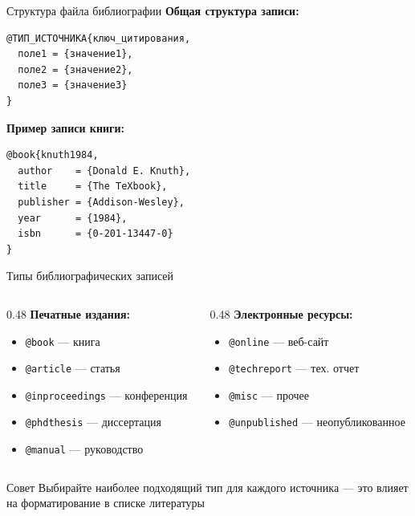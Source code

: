 \documentclass[aspectratio=169, 12pt]{beamer}
\begin{document}
\begin{frame}[fragile]{Структура файла библиографии}
  \textbf{Общая структура записи:}
  
  \begin{lstlisting}
@ТИП_ИСТОЧНИКА{ключ_цитирования,
  поле1 = {значение1},
  поле2 = {значение2},
  поле3 = {значение3}
}
  \end{lstlisting}
  
  \vspace{0.5cm}
  
  \textbf{Пример записи книги:}
  
  \begin{lstlisting}
@book{knuth1984,
  author    = {Donald E. Knuth},
  title     = {The TeXbook},
  publisher = {Addison-Wesley},
  year      = {1984},
  isbn      = {0-201-13447-0}
}
  \end{lstlisting}
\end{frame}

\begin{frame}{Типы библиографических записей}
  \begin{columns}[T]
    \begin{column}{0.48\textwidth}
      \textbf{Печатные издания:}
      \begin{itemize}
        \item \texttt{@book} — книга
        \item \texttt{@article} — статья
        \item \texttt{@inproceedings} — конференция
        \item \texttt{@phdthesis} — диссертация
        \item \texttt{@manual} — руководство
      \end{itemize}
    \end{column}
    
    \begin{column}{0.48\textwidth}
      \textbf{Электронные ресурсы:}
      \begin{itemize}
        \item \texttt{@online} — веб-сайт
        \item \texttt{@techreport} — тех. отчет
        \item \texttt{@misc} — прочее
        \item \texttt{@unpublished} — неопубликованное
      \end{itemize}
    \end{column}
  \end{columns}
  
  \vspace{1cm}
  
  \begin{exampleblock}{Совет}
    Выбирайте наиболее подходящий тип для каждого источника — это влияет на форматирование в списке литературы
  \end{exampleblock}
\end{frame}
\end{document}

